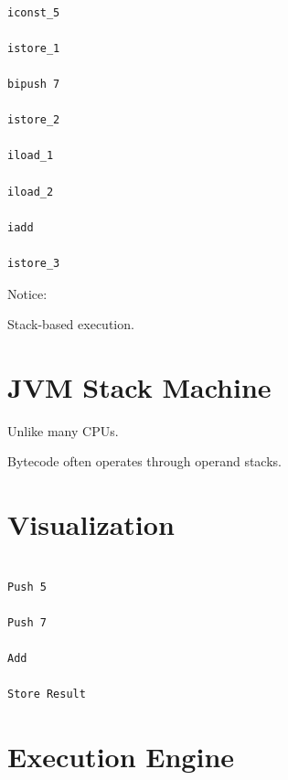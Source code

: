 \documentclass[11pt,a4paper]{book}
\begin{document}
\begin{verbatim}

iconst_5

istore_1

bipush 7

istore_2

iload_1

iload_2

iadd

istore_3

\end{verbatim}


Notice:


Stack-based execution.


\section{JVM Stack Machine}

Unlike many CPUs.


Bytecode often operates
through operand stacks.


\section{Visualization}

\begin{verbatim}

Push 5

Push 7

Add

Store Result

\end{verbatim}


\section{Execution Engine}
\end{document}
